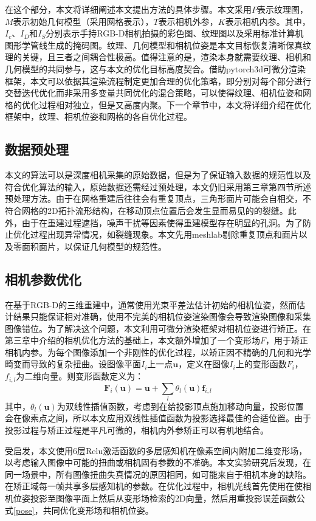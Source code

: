 在这个部分，本文将详细阐述本文提出方法的具体步骤。本文采用$P$表示纹理图，$M$表示初始几何模型（采用网格表示），$T$表示相机外参，$K$表示相机内参。其中，$I_c$、$I_D$和$I_S$分别表示手持RGB-D相机拍摄的彩色图、纹理图以及采用标准计算机图形学管线生成的掩码图。纹理、几何模型和相机位姿是本文目标恢复清晰保真纹理的关键，且三者之间耦合性极高。值得注意的是，渲染本身就需要纹理、相机和几何模型的共同参与，这与本文的优化目标高度契合。借助pytorch3d可微分渲染框架，本文可以依据其渲染流程制定更加合理的优化策略，即分别对每个部分进行交替迭代优化而非采用多变量共同优化的混合策略，可以使得纹理、相机位姿和网格的优化过程相对独立，但是又高度内聚。下一个章节中，本文将详细介绍在优化框架中，纹理、相机位姿和网格的各自优化过程。\par


\subsection{数据预处理}
本文的算法可以是深度相机采集的原始数据，但是为了保证输入数据的规范性以及符合优化算法的输入，原始数据还需经过预处理，本文仍旧采用第三章第四节所述预处理方法。由于在网格重建后往往会有重复顶点，三角形面片可能会自相交，不符合网格的2D拓扑流形结构，在移动顶点位置后会发生显而易见的的裂缝。此外，由于在重建过程遮挡，噪声干扰等因素使得重建模型存在明显的孔洞。为了防止优化过程出现异常情况，如裂缝现象。本文先用meshlab剔除重复顶点和面片以及零面积面片，以保证几何模型的规范性。

%
\subsection{相机参数优化}

在基于RGB-D的三维重建中，通常使用光束平差法估计初始的相机位姿，然而估计结果只能保证相对准确，使用不完美的相机位姿渲染图像会导致渲染图像和采集图像错位。为了解决这个问题，本文利用可微分渲染框架对相机位姿进行矫正。在第三章中介绍的相机优化方法的基础上，本文额外增加了一个变形场$F$，用于矫正相机内参。为每个图像添加一个非刚性的优化过程，以矫正因不精确的几何和光学畸变而导致的复杂扭曲。设图像平面$I_i$上一点$\mathbf{u}$，定义在图像$I_i$上的变形函数$F_i$，$f_{i,l}$为二维向量。则变形函数定义为：
\begin{equation}
	\mathbf{F}_{i}(\mathbf{u})=\mathbf{u}+\sum_{l} \theta_{l}(\mathbf{u}) \mathbf{f}_{i, l}
\end{equation}
其中，$\theta_{l}(\mathbf{u})$为双线性插值函数，考虑到在给投影顶点施加移动向量，投影位置会在像素点之间，所以本文应用双线性插值函数为投影选择最佳的合适位置。由于投影过程与矫正过程是平凡可微的，相机内外参矫正可以有机地结合。\par
受启发，本文使用6层Relu激活函数的多层感知机在像素空间内附加二维变形场，以考虑输入图像中可能的扭曲或相机固有参数的不准确。本文实验研究后发现，在同一场景中，所有图像扭曲失真情况的原因相同，如可能来自于相机本身的缺陷。在矫正域每一帧共享多层感知机的参数。在优化过程中，相机光线首先使用在使相机位姿投影至图像平面上然后从变形场检索的2D向量，然后用重投影误差函数公式\eqref{pose}，共同优化变形场和相机位姿。

